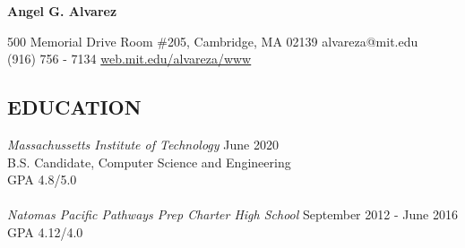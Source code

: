 \documentclass{res}
\begin{document}
\centerline{\large\bf\Huge Angel G. Alvarez}
500 Memorial Drive Room \small{\#}205, Cambridge, MA 02139 \hfill alvareza\small{@}mit.edu \\
(916) 756 - 7134 \hfill \uline{web.mit.edu/alvareza/www}

\begin{resume}
\section{EDUCATION} 

  {\sl Massachussetts Institute of Technology}               \hfill June 2020\\    
    B.S. Candidate, Computer Science and Engineering \\
    GPA 4.8/5.0 \\ \\
  {\sl Natomas Pacific Pathways Prep Charter High School}    \hfill September 2012 - June 2016 \\
    GPA 4.12/4.0 

\end{resume}
\end{document}

